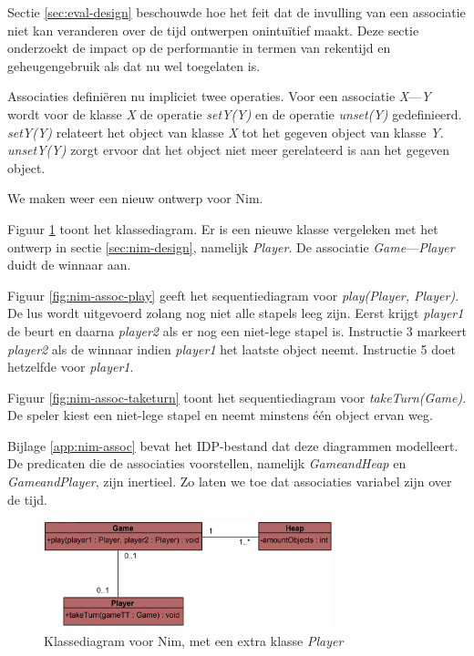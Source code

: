 Sectie \ref{sec:eval-design} beschouwde hoe het feit dat de invulling van een associatie niet kan veranderen over de tijd ontwerpen onintu\"itief maakt. Deze sectie onderzoekt de impact op de performantie in termen van rekentijd en geheugengebruik als dat nu wel toegelaten is.

Associaties defini\"eren nu impliciet twee operaties. Voor een associatie \textit{X}---\textit{Y} wordt voor de klasse \textit{X} de operatie \textit{setY(Y)} en de operatie \textit{unset(Y)} gedefinieerd. \textit{setY(Y)} relateert het object van klasse \textit{X} tot het gegeven object van klasse \textit{Y}. \textit{unsetY(Y)} zorgt ervoor dat het object niet meer gerelateerd is aan het gegeven object.

We maken weer een nieuw ontwerp voor Nim.

Figuur \ref{fig:nim-assoc-cd} toont het klassediagram. Er is een nieuwe klasse vergeleken met het ontwerp in sectie \ref{sec:nim-design}, namelijk \textit{Player}. De associatie \textit{Game}---\textit{Player} duidt de winnaar aan.

Figuur \ref{fig:nim-assoc-play} geeft het sequentiediagram voor \textit{play(Player, Player)}. De lus wordt uitgevoerd zolang nog niet alle stapels leeg zijn. Eerst krijgt \textit{player1} de beurt en daarna \textit{player2} als er nog een niet-lege stapel is. Instructie 3 markeert \textit{player2} als de winnaar indien \textit{player1} het laatste object neemt. Instructie 5 doet hetzelfde voor \textit{player1}.

Figuur \ref{fig:nim-assoc-taketurn} toont het sequentiediagram voor \textit{takeTurn(Game)}. De speler kiest een niet-lege stapel en neemt minstens \'e\'en object ervan weg.

Bijlage \ref{app:nim-assoc} bevat het IDP-bestand dat deze diagrammen modelleert. De predicaten die de associaties voorstellen, namelijk \textit{GameandHeap} en \textit{GameandPlayer}, zijn inertieel. Zo laten we toe dat associaties variabel zijn over de tijd.

\begin{figure}
	\centering
	\includegraphics[width=0.75\textwidth]{chap-declaratieve-seq/nim-assoc-cd.png}
	\caption{Klassediagram voor Nim, met een extra klasse \textit{Player}}
	\label{fig:nim-assoc-cd}
\end{figure}


